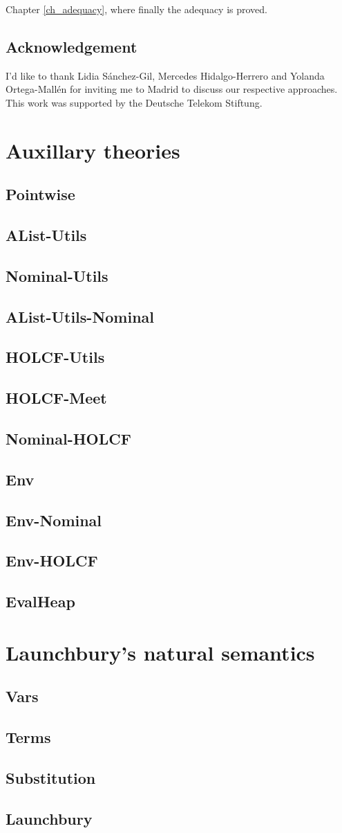 \documentclass[11pt,a4paper,parskip=half]{scrartcl}
\begin{document}
Chapter \ref{ch_adequacy}, where finally the adequacy is proved.

%
%

\subsection{Acknowledgement}


I’d like to thank Lidia Sánchez-Gil, Mercedes Hidalgo-Herrero and Yolanda Ortega-Mallén for inviting me to Madrid to discuss our respective approaches.\\
This work was supported by the Deutsche Telekom Stiftung.

\clearpage
\newcommand{\theory}[1]{\subsection{#1}\label{sec_#1}}

\section{Auxillary theories}
\label{ch_aux}

\theory{Pointwise}
\theory{AList-Utils}

\theory{Nominal-Utils}
\theory{AList-Utils-Nominal}

\theory{HOLCF-Utils}
\theory{HOLCF-Meet}
\theory{Nominal-HOLCF}


\theory{Env}
\theory{Env-Nominal}
\theory{Env-HOLCF}
\theory{EvalHeap}


\clearpage
\section{Launchbury's natural semantics}
\label{ch_natsem}

\theory{Vars}
\theory{Terms}
\theory{Substitution}
\theory{Launchbury}
\end{document}
